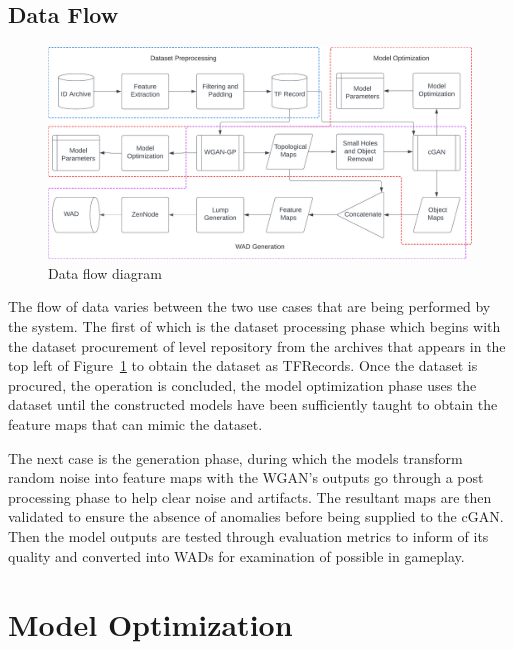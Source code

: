 \documentclass{Configuration_Files/PoliMi3i_thesis}
\begin{document}
\subsection{Data Flow}
\begin{figure}[H]
    \centering
    \includegraphics[width=1\textwidth]{data_flow.jpeg}
    \caption{Data flow diagram}
    \label{fig:dataflow}
\end{figure}
The flow of data varies between the two use cases that are being performed by the 
system. The first of which is the dataset processing phase which begins with the 
dataset procurement of level repository from the archives that appears in the top left 
of Figure~\ref{fig:dataflow} to obtain the dataset as TFRecords. Once the dataset is procured, the 
operation is concluded, the model optimization phase uses the dataset until the 
constructed models have been sufficiently taught to obtain the feature maps that can 
mimic the dataset.

The next case is the generation phase, during which the models transform random 
noise into feature maps with the WGAN’s outputs go through a post processing 
phase to help clear noise and artifacts. The resultant maps are then validated to 
ensure the absence of anomalies before being supplied to the cGAN. Then the model 
outputs are tested through evaluation metrics to inform of its quality and converted 
into WADs for examination of possible in gameplay.
\newpage

\section{Model Optimization}
\end{document}
